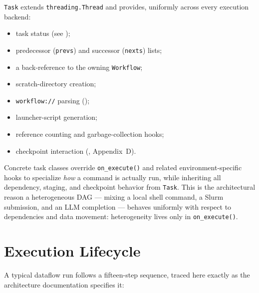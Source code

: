 \texttt{Task} extends \texttt{threading.Thread} and provides, uniformly
across every execution backend:

\begin{itemize}[leftmargin=1.4em]
  \item task status (see );
  \item predecessor (\texttt{prevs}) and successor (\texttt{nexts}) lists;
  \item a back-reference to the owning \texttt{Workflow};
  \item scratch-directory creation;
  \item \texttt{workflow://} parsing ();
  \item launcher-script generation;
  \item reference counting and garbage-collection hooks;
  \item checkpoint interaction (, Appendix~D).
\end{itemize}

Concrete task classes override \texttt{on\_execute()} and related
environment-specific hooks to specialize \emph{how} a command is actually
run, while inheriting all dependency, staging, and checkpoint behavior from
\texttt{Task}. This is the architectural reason a heterogeneous DAG --- mixing
a local shell command, a Slurm submission, and an LLM completion --- behaves
uniformly with respect to dependencies and data movement: heterogeneity lives
only in \texttt{on\_execute()}.

\section{Execution Lifecycle}
\label{sec:execution-lifecycle}

A typical dataflow run follows a fifteen-step sequence, traced here exactly
as the architecture documentation specifies it:


